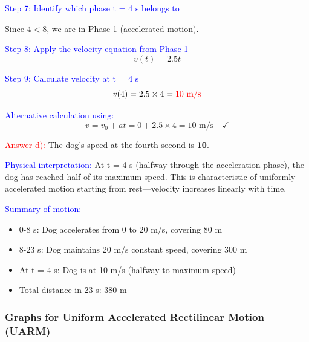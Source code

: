 \begin{exercise}
\begin{solu}
        \textcolor{blue}{Step 7: Identify which phase t = 4 s belongs to}

        Since $4 < 8$, we are in Phase 1 (accelerated motion).

        \textcolor{blue}{Step 8: Apply the velocity equation from Phase 1}
        \[
            v(t) = 2.5t
        \]

        \textcolor{blue}{Step 9: Calculate velocity at t = 4 s}
        \[
            v(4) = 2.5 \times 4 = \textcolor{red}{10 \text{ m/s}}
        \]

        \textcolor{blue}{Alternative calculation using:}
        \[
            v = v_0 + at = 0 + 2.5 \times 4 = 10 \text{ m/s} \quad \checkmark
        \]

        \textcolor{red}{Answer d):} The dog's speed at the fourth second is \textbf{\qty{10}{\mps}}.

        \vspace{0.3cm}

        \textcolor{blue}{Physical interpretation:} At t = 4 s (halfway through the acceleration phase), the dog has reached half of its maximum speed. This is characteristic of uniformly accelerated motion starting from rest—velocity increases linearly with time.

        \vspace{0.3cm}

        \textcolor{blue}{Summary of motion:}
        \begin{itemize}
            \item 0-8 s: Dog accelerates from 0 to 20 m/s, covering 80 m
            \item 8-23 s: Dog maintains 20 m/s constant speed, covering 300 m
            \item At t = 4 s: Dog is at 10 m/s (halfway to maximum speed)
            \item Total distance in 23 s: 380 m
        \end{itemize}
    \end{solu}
\end{exercise}

\subsubsection{Graphs for Uniform Accelerated Rectilinear Motion (UARM)}

